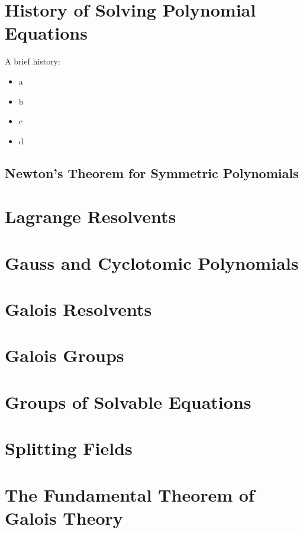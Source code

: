 \documentclass[12pt]{scrartcl}
\begin{document}
\section{History of Solving Polynomial Equations}
A brief history:
\begin{itemize}
	\item a
	\item b
	\item c
	\item d
\end{itemize}

\subsection{Newton's Theorem for Symmetric Polynomials}

\section{Lagrange Resolvents}

\section{Gauss and Cyclotomic Polynomials}

\section{Galois Resolvents}

\section{Galois Groups}

\section{Groups of Solvable Equations}

\section{Splitting Fields}

\section{The Fundamental Theorem of Galois Theory}
\end{document}
